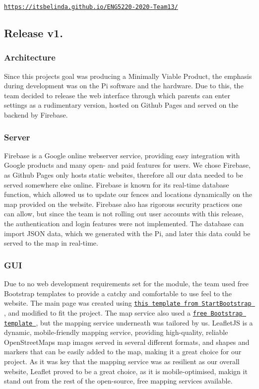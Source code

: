 \href{https://itsbelinda.github.io/ENG5220-2020-Team13/}{\tt https\+://itsbelinda.\+github.\+io/\+E\+N\+G5220-\/2020-\/\+Team13/} \subsection*{Release v1.}

\subsubsection*{Architecture}

Since this project\textquotesingle{}s goal was producing a Minimally Viable Product, the emphasis during development was on the Pi software and the hardware. Due to this, the team decided to release the web interface through which parents can enter settings as a rudimentary version, hosted on Github Pages and served on the backend by Firebase. 

\subsubsection*{Server}

Firebase is a Google online webserver service, providing easy integration with Google products and many open-\/ and paid features for users. We chose Firebase, as Github Pages only hosts static websites, therefore all our data needed to be served somewhere else online. Firebase is known for its real-\/time database function, which allowed us to update our fences and locations dynamically on the map provided on the website. Firebase also has rigorous security practices one can allow, but since the team is not rolling out user accounts with this release, the authentication and login features were not implemented. The database can import J\+S\+ON data, which we generated with the Pi, and later this data could be served to the map in real-\/time.

\subsubsection*{G\+UI}

Due to no web development requirements set for the module, the team used free Bootstrap templates to provide a catchy and comfortable to use feel to the website. The main page was created using \href{https://startbootstrap.com/themes/agency/}{\tt this template from Start\+Bootstrap }, and modified to fit the project. The map service also used a \href{https://github.com/jumpinjackie/bootstrap-viewer-template/tree/master/2-column}{\tt free Bootstrap template }, but the mapping service underneath was tailored by us. Leaflet\+JS is a dynamic, mobile-\/friendly mapping service, providing high-\/quality, reliable Open\+Street\+Maps map images served in several different formats, and shapes and markers that can be easily added to the map, making it a great choice for our project. As it was key that the mapping service was as resilient as our overall website, Leaflet proved to be a great choice, as it is mobile-\/optimised, makign it stand out from the rest of the open-\/source, free mapping services available.


